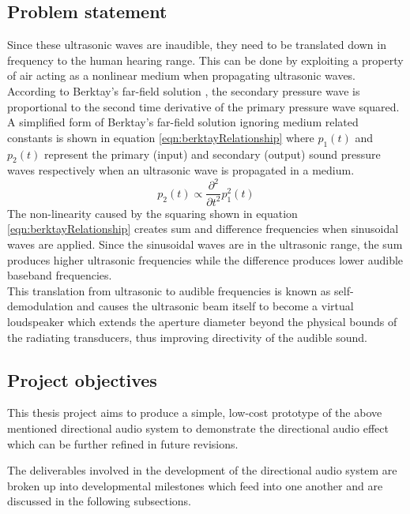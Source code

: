 \subsection{Problem statement}
Since these ultrasonic waves are inaudible, they need to be translated down in frequency to the human hearing range. This can be done by exploiting a property of air acting as a nonlinear medium when propagating ultrasonic waves. According to Berktay's far-field solution \cite{berktay_1965}, the secondary pressure wave is proportional to the second time derivative of the primary pressure wave squared. A simplified form of Berktay's far-field solution ignoring medium related constants is shown in equation \ref{eqn:berktayRelationship} where $p_1 (t)$ and $p_2 (t)$ represent the primary (input) and secondary (output) sound pressure waves respectively when an ultrasonic wave is propagated in a medium.
\begin{equation}
    p_2(t) \propto \frac{\partial^2}{\partial t^2}p_1^2(t)
    \label{eqn:berktayRelationship}
\end{equation}
The non-linearity caused by the squaring shown in equation \ref{eqn:berktayRelationship} creates sum and difference frequencies when sinusoidal waves are applied. Since the sinusoidal waves are in the ultrasonic range, the sum produces higher ultrasonic frequencies while the difference produces lower audible baseband frequencies.\\
This translation from ultrasonic to audible frequencies is known as self-demodulation and causes the ultrasonic beam itself to become a virtual loudspeaker which extends the aperture diameter beyond the physical bounds of the radiating transducers, thus improving directivity of the audible sound.
\subsection{Project objectives}
This thesis project aims to produce a simple, low-cost prototype of the above mentioned directional audio system to demonstrate the directional audio effect which can be further refined in future revisions.

The deliverables involved in the development of the directional audio system are broken up into developmental milestones which feed into one another and are discussed in the following subsections.
